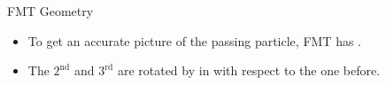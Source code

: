 \begin{frame}{FMT Geometry}
    \label{20.02::fmt_geometry}

    \vspace{6pt}

    \begin{itemize}
        \item
            To get an accurate picture of the passing particle, FMT has .

        \item
            The $2^\text{nd}$ and $3^\text{rd}$ are rotated by  in  with respect to the one before.
    \end{itemize}

    \vspace{6pt}

    \begin{center}
    \end{center}

\end{frame}
